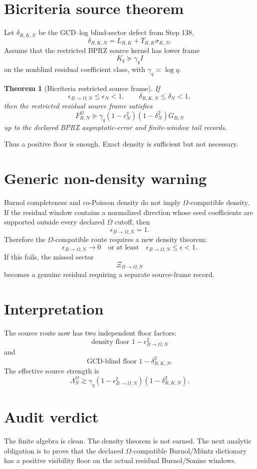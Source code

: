 \documentclass[11pt]{article}
\newtheorem{theorem}{Theorem}
\begin{document}
\section{Bicriteria source theorem}
Let $\delta_{R,K,N}$ be the GCD--log blind-sector defect from Step 138,
\[
\delta_{R,K,N}=L_{R,K}+T_{R,K}\sigma_{K,N}.
\]
Assume that the restricted BPRZ source kernel has lower frame
\[
K_q\succeq \gamma_q I
\]
on the nonblind residual coefficient class, with $\gamma_q\asymp \log q$.

\begin{theorem}[Bicriteria restricted source frame]
If
\[
\epsilon_{B\to\Omega,N}\le \epsilon_N<1,
\qquad
\delta_{R,K,N}\le \delta_N<1,
\]
then the restricted residual source frame satisfies
\[
\boxed{
F_{R,N}^{\Omega}
\succeq
\gamma_q(1-\epsilon_N^2)(1-\delta_N^2)G_{R,N}
}
\]
up to the declared BPRZ asymptotic-error and finite-window tail records.
\end{theorem}

Thus a positive floor is enough.  Exact density is sufficient but not necessary.

\section{Generic non-density warning}
Burnol completeness and co-Poisson density do not imply $\Omega$-compatible density.  If the residual window contains a normalized direction whose seed coefficients are supported outside every declared $\Omega$ cutoff, then
\[
\epsilon_{B\to\Omega,N}=1.
\]
Therefore the $\Omega$-compatible route requires a new density theorem:
\[
\boxed{
\epsilon_{B\to\Omega,N}\to0
\quad\text{or at least}\quad
\epsilon_{B\to\Omega,N}\le \epsilon<1.
}
\]
If this fails, the missed sector
\[
\Xi_{B\to\Omega,N}
\]
becomes a genuine residual requiring a separate source-frame record.

\section{Interpretation}
The source route now has two independent floor factors:
\[
\boxed{
\text{density floor } 1-\epsilon_{B\to\Omega,N}^{2}
}
\]
and
\[
\boxed{
\text{GCD-blind floor } 1-\delta_{R,K,N}^{2}.
}
\]
The effective source strength is
\[
\boxed{
\Lambda_N^{\Omega}
\gtrsim
\gamma_q
(1-\epsilon_{B\to\Omega,N}^{2})
(1-\delta_{R,K,N}^{2}).
}
\]

\section{Audit verdict}
The finite algebra is clean.  The density theorem is not earned.  The next analytic obligation is to prove that the declared $\Omega$-compatible Burnol/M\"untz dictionary has a positive visibility floor on the actual residual Burnol/Sonine windows.
\end{document}
